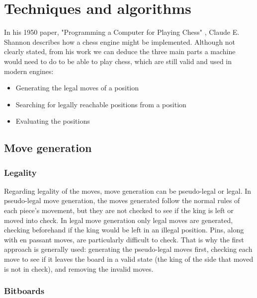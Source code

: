 \chapter{Techniques and algorithms}
\label{chap:ch2}

In his 1950 paper, "Programming a Computer for Playing Chess" \cite{shannon1950xxii}, Claude E. Shannon describes how a chess engine might be implemented. Although not clearly stated, from his work we can deduce the three main parts a machine would need to do to be able to play chess, which are still valid and used in modern engines:
\begin{itemize}
    \item Generating the legal moves of a position
    \item Searching for legally reachable positions from a position
    \item Evaluating the positions
\end{itemize}

\section{Move generation}
\label{sec:ch2sec1}

\subsection{Legality}
\label{subsec:ch2sec1subsec1}

Regarding legality of the moves, move generation can be pseudo-legal or legal. In pseudo-legal move generation, the moves generated follow the normal rules of each piece's movement, but they are not checked to see if the king is left or moved into check. In legal move generation only legal moves are generated, checking beforehand if the king would be left in an illegal position. Pins, along with en passant moves, are particularly difficult to check. That is why the first approach is generally used: generating the pseudo-legal moves first, checking each move to see if it leaves the board in a valid state (the king of the side that moved is not in check), and removing the invalid moves.

\subsection{Bitboards}
\label{subsec:ch2sec1subsec2}

